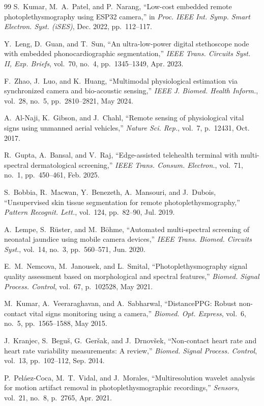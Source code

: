 \documentclass[journal]{IEEEtran}
\begin{document}
\begin{thebibliography}{99}
S.~Kumar, M.~A.~Patel, and P.~Narang,
``Low-cost embedded remote photoplethysmography using ESP32 camera,''
in \emph{Proc. IEEE Int. Symp. Smart Electron. Syst. (iSES)}, Dec. 2022, pp.~112--117.

Y.~Leng, D.~Guan, and T.~Sun,
``An ultra-low-power digital stethoscope node with embedded phonocardiographic segmentation,''
\emph{IEEE Trans. Circuits Syst. II, Exp. Briefs}, vol.~70, no.~4, pp.~1345--1349, Apr. 2023.

F.~Zhao, J.~Luo, and K.~Huang,
``Multimodal physiological estimation via synchronized camera and bio-acoustic sensing,''
\emph{IEEE J. Biomed. Health Inform.}, vol.~28, no.~5, pp.~2810--2821, May 2024.

A.~Al-Naji, K.~Gibson, and J.~Chahl,
``Remote sensing of physiological vital signs using unmanned aerial vehicles,''
\emph{Nature Sci. Rep.}, vol.~7, p.~12431, Oct. 2017.

R.~Gupta, A.~Bansal, and V.~Raj,
``Edge-assisted telehealth terminal with multi-spectral dermatological screening,''
\emph{IEEE Trans. Consum. Electron.}, vol.~71, no.~1, pp.~450--461, Feb. 2025.

S.~Bobbia, R.~Macwan, Y.~Benezeth, A.~Mansouri, and J.~Dubois,
``Unsupervised skin tissue segmentation for remote photoplethysmography,''
\emph{Pattern Recognit. Lett.}, vol.~124, pp.~82--90, Jul. 2019.

A.~Lempe, S.~R{\"u}ster, and M.~B{\"o}hme,
``Automated multi-spectral screening of neonatal jaundice using mobile camera devices,''
\emph{IEEE Trans. Biomed. Circuits Syst.}, vol.~14, no.~3, pp.~560--571, Jun. 2020.

E.~M.~Nemcova, M.~Janousek, and L.~Smital,
``Photoplethysmography signal quality assessment based on morphological and spectral features,''
\emph{Biomed. Signal Process. Control}, vol.~67, p.~102528, May 2021.

M.~Kumar, A.~Veeraraghavan, and A.~Sabharwal,
``DistancePPG: Robust non-contact vital signs monitoring using a camera,''
\emph{Biomed. Opt. Express}, vol.~6, no.~5, pp.~1565--1588, May 2015.

J.~Kranjec, S.~Begu{\v{s}}, G.~Ger{\v{s}}ak, and J.~Drnov{\v{s}}ek,
``Non-contact heart rate and heart rate variability measurements: A review,''
\emph{Biomed. Signal Process. Control}, vol.~13, pp.~102--112, Sep. 2014.

P.~Pel{\'a}ez-Coca, M.~T.~Vidal, and J.~Morales,
``Multiresolution wavelet analysis for motion artifact removal in photoplethysmographic recordings,''
\emph{Sensors}, vol.~21, no.~8, p.~2765, Apr. 2021.


\end{thebibliography}
\end{document}
